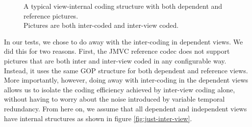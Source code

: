 \documentclass[twoside, 11pt]{article}
\begin{document}
\begin{figure}[H]
\begin{center}
\end{center}
\caption{
A typical view-internal coding structure
with both dependent and reference pictures. \\
Pictures are both inter-coded and inter-view coded.
}
\label{fig:inter-view}
\end{figure}

In our tests, we chose to do away with the inter-coding in dependent views. We
did this for two reasons. First, the JMVC reference codec does not support
pictures that are both inter and inter-view coded in any configurable way.
Instead, it uses the same GOP structure for both dependent and reference views.
More importantly, however, doing away with inter-coding in the dependent views
allows us to isolate the coding efficiency achieved by inter-view coding alone,
without having to worry about the noise introduced by variable temporal
redundancy. From here on, we assume that all dependent and independent views
have internal structures as shown in figure \ref{fig:just-inter-view}.
\end{document}

